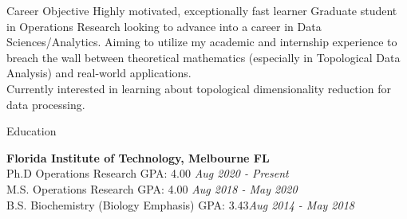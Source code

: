 \documentclass{resume} %
\begin{document}

\begin{rSection}{Career Objective}
    Highly motivated, exceptionally fast learner Graduate student in Operations Research looking to advance into a career in Data Sciences/Analytics. 
    Aiming to utilize my academic and internship experience to breach the wall between theoretical mathematics (especially in Topological Data Analysis) and real-world applications.\\
    Currently interested in learning about topological dimensionality reduction for data processing.
\end{rSection}




\begin{rSection}{Education}

    {\bf Florida Institute of Technology, Melbourne FL}
    \\ Ph.D Operations Research  GPA: 4.00 \hfill {\em Aug 2020 - Present}
    \\ M.S. Operations Research  GPA: 4.00 \hfill {\em Aug 2018 - May 2020}
    \\ B.S. Biochemistry (Biology Emphasis)    GPA: 3.43\hfill {\em Aug 2014 - May 2018}
\end{rSection}

\end{document}
